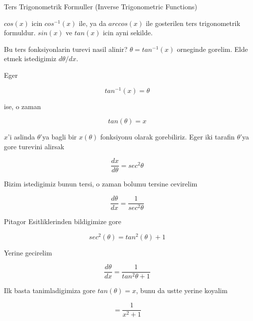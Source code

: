 \documentclass[12pt,fleqn]{article}
\begin{document}
Ters Trigonometrik Formuller (Inverse Trigonometric Functions)

$cos(x)$ icin $cos^{-1}(x)$ ile, ya da $arccos(x)$ ile gosterilen ters
trigonometrik formuldur. $sin(x)$ ve $tan(x)$ icin ayni sekilde. 

Bu ters fonksiyonlarin turevi nasil alinir? $\theta = tan^{-1}(x)$ orneginde
gorelim. Elde etmek istedigimiz $d\theta/dx$. 

Eger

\[ tan^{-1}(x) = \theta\]

ise, o zaman 

\[ tan(\theta) = x \]

$x$'i aslinda $\theta$'ya bagli bir $x(\theta)$ fonksiyonu olarak gorebiliriz. 
Eger iki tarafin $\theta$'ya gore turevini alirsak

\[ \frac{dx}{d\theta} = sec^{2}\theta \]

Bizim istedigimiz bunun tersi, o zaman bolumu tersine cevirelim

\[ \frac{d\theta}{dx} = \frac{1}{sec^{2}\theta} \]

Pitagor Esitliklerinden bildigimize gore

\[ sec^{2}(\theta) = tan^{2}(\theta) + 1 \]

Yerine gecirelim

\[ \frac{d\theta}{dx} = \frac{1}{tan^{2}\theta + 1} \]

Ilk basta tanimladigimiza gore $tan(\theta) = x$, bunu da ustte yerine
koyalim

\[  = \frac{1}{x^2 + 1} \]
\end{document}
